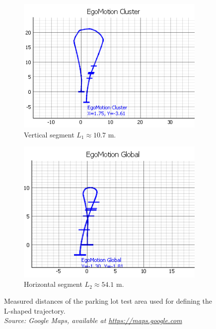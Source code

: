 \begin{figure}[!htbp]
    \centering
    \begin{subfigure}{0.48\linewidth}
        \centering
        \includegraphics[width=\linewidth]{images/labDriveAroundICP_Cluster1.png}
        \caption{Vertical segment $L_1 \approx 10.7$ m.}
        \label{fig:labDriveAroundClustered}
    \end{subfigure}
    \hfill
    \begin{subfigure}{0.48\linewidth}
        \centering
        \includegraphics[width=\linewidth]{images/labDriveAroundICP_Full1.png}
        \caption{Horizontal segment $L_2 \approx 54.1$ m.}
        \label{fig:labDriveAroundFull}
    \end{subfigure}
    \caption{Measured distances of the parking lot test area used for defining the L-shaped trajectory.\\
    \textit{Source: Google Maps, available at \url{https://maps.google.com} \cite{googlemaps_fhdo}}}
    \label{fig:labDriveAround}
\end{figure}

